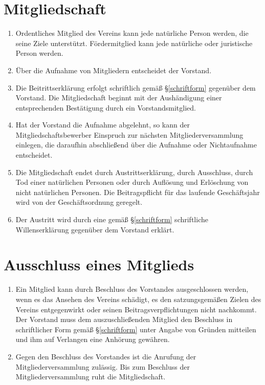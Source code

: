 \documentclass[fontsize=12pt,paper=a4,pagesize,headings=small]{scrartcl}
\begin{document}
\section{Mitgliedschaft}
\begin{enumerate}
	\item Ordentliches Mitglied des Vereins kann jede natürliche Person werden,
		die seine Ziele unterstützt. Fördermitglied kann jede natürliche oder
		juristische Person werden.

	\item Über die Aufnahme von Mitgliedern entscheidet der Vorstand.

	\item Die Beitrittserklärung erfolgt schriftlich gemäß §\ref{schriftform}
		gegenüber dem Vorstand. Die Mitgliedschaft beginnt mit der Aushändigung einer
		entsprechenden Bestätigung durch ein Vorstandsmitglied.

	\item Hat der Vorstand die Aufnahme abgelehnt, so kann der
		Mitgliedschaftsbewerber Einspruch zur nächsten Mitgliederversammlung
		einlegen, die daraufhin abschließend über die Aufnahme oder Nichtaufnahme
		entscheidet.

	\item Die Mitgliedschaft endet durch Austrittserklärung, durch
		Ausschluss, durch Tod einer natürlichen Personen oder durch Auflösung
		und Erlöschung von nicht natürlichen Personen. Die Beitragspflicht
		für das laufende Geschäftsjahr wird von der Geschäftsordnung geregelt.

	\item Der Austritt wird durch eine gemäß §\ref{schriftform}
		schriftliche Willenserklärung gegenüber dem Vorstand erklärt.

\end{enumerate}

\newpage{}
\section{Ausschluss eines Mitglieds}

\begin{enumerate}
	\item Ein Mitglied kann durch Beschluss des Vorstandes ausgeschlossen
		werden, wenn es das Ansehen des Vereins schädigt, es den satzungsgemäßen
		Zielen des Vereins entgegenwirkt oder seinen Beitragsverpflichtungen
		nicht nachkommt. Der Vorstand muss dem auszuschließenden Mitglied den
		Beschluss in schriftlicher Form gemäß §\ref{schriftform} unter Angabe von Gründen
		mitteilen und ihm auf Verlangen eine Anhörung gewähren.

	\item Gegen den Beschluss des Vorstandes ist die Anrufung der
		Mitgliederversammlung zulässig. Bis zum Beschluss der
		Mitgliederversammlung ruht die Mitgliedschaft.
\end{enumerate}
\end{document}
